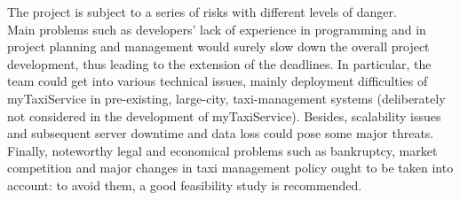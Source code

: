 The project is subject to a series of risks with different levels of danger.\\
Main problems such as developers' lack of experience in programming and in project planning and management would surely slow down the overall project development, thus leading to the extension of the deadlines.
In particular, the team could get into various technical issues, mainly deployment difficulties of myTaxiService in pre-existing, large-city, taxi-management systems (deliberately not considered in the development of myTaxiService). Besides, scalability issues and subsequent server downtime and data loss could pose some major threats.
Finally, noteworthy legal and economical problems such as bankruptcy, market competition and major changes in taxi management policy ought to be taken into account: to avoid them, a good feasibility study is recommended.